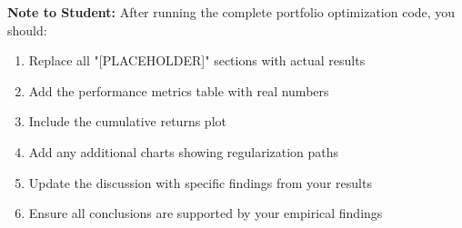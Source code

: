 \documentclass[12pt]{article}
\begin{document}
\textbf{Note to Student:} After running the complete portfolio optimization code, you should:

\begin{enumerate}
    \item Replace all "[PLACEHOLDER]" sections with actual results
    \item Add the performance metrics table with real numbers
    \item Include the cumulative returns plot
    \item Add any additional charts showing regularization paths
    \item Update the discussion with specific findings from your results
    \item Ensure all conclusions are supported by your empirical findings
\end{enumerate}
\end{document}
